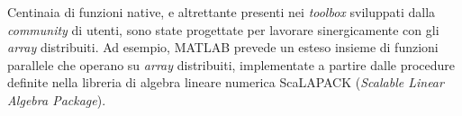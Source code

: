 Centinaia di funzioni native, e altrettante presenti nei \textit{toolbox} sviluppati dalla \textit{community} di utenti, sono state progettate per lavorare sinergicamente con gli \textit{array} distribuiti.\newline
Ad esempio, MATLAB prevede un esteso insieme di funzioni parallele che operano su \textit{array} distribuiti, implementate a partire dalle procedure definite nella libreria di algebra lineare numerica ScaLAPACK (\textit{Scalable Linear Algebra Package}).